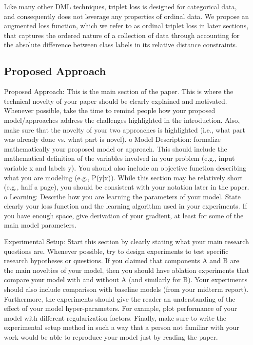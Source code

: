 Like many other DML techniques,
triplet loss is designed for categorical data, and consequently does not leverage any properties of ordinal data. 
We propose an augmented %
loss function, which we refer to as ordinal triplet loss in later sections, that captures the ordered nature of a collection of data through accounting for %
the absolute difference between class labels in its relative distance constraints.

\subsection{Proposed Approach}



\iffalse
Proposed Approach: This is the main section of the paper. This is where the technical novelty of
your paper should be clearly explained and motivated. Whenever possible, take the time to
remind people how your proposed model/approaches address the challenges highlighted in the
introduction. Also, make sure that the novelty of your two approaches is highlighted (i.e., what
part was already done vs. what part is novel).
o Model Description: formalize mathematically your proposed model or approach. This
should include the mathematical definition of the variables involved in your problem
(e.g., input variable x and labels y). You should also include an objective function
describing what you are modeling (e.g., P(y|x)). While this section may be relatively
short (e.g., half a page), you should be consistent with your notation later in the paper.
o Learning: Describe how you are learning the parameters of your model. State clearly
your loss function and the learning algorithm used in your experiments. If you have
enough space, give derivation of your gradient, at least for some of the main model
parameters.

Experimental Setup: Start this section by clearly stating what your main research questions are.
Whenever possible, try to design experiments to test specific research hypotheses or questions.
If you claimed that components A and B are the main novelties of your model, then you should
have ablation experiments that compare your model with and without A (and similarly for B).
Your experiments should also include comparison with baseline models (from your midterm
report). Furthermore, the experiments should give the reader an understanding of the effect of
your model hyper-parameters. For example, plot performance of your model with different
regularization factors. Finally, make sure to write the experimental setup method in such a way
that a person not familiar with your work would be able to reproduce your model just by
reading the paper.


